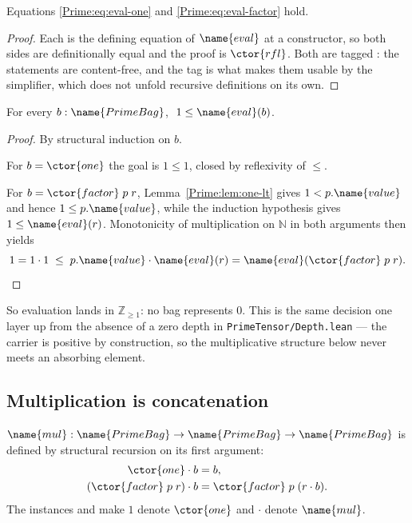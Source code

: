 \begin{lemma}
\label{Prime:lem:eval-eqs}
Equations \eqref{Prime:eq:eval-one} and \eqref{Prime:eq:eval-factor} hold.
\end{lemma}

\begin{proof}
Each is the defining equation of $\name{eval}$ at a constructor, so both sides
are definitionally equal and the proof is $\ctor{rfl}$.  Both are tagged
: the statements are content-free, and the tag is what makes
them usable by the simplifier, which does not unfold recursive definitions on
its own.
\end{proof}

\begin{lemma}\label{Prime:lem:one-le-eval}
For every $b : \name{PrimeBag}$, $\; 1 \leq \name{eval}(b)$.
\end{lemma}

\begin{proof}
By structural induction on $b$.

For $b = \ctor{one}$ the goal is $1 \leq 1$, closed by reflexivity of $\leq$.

For $b = \ctor{factor}\;p\;r$, Lemma~\ref{Prime:lem:one-lt} gives
$1 < p.\name{value}$ and hence $1 \leq p.\name{value}$, while the induction
hypothesis gives $1 \leq \name{eval}(r)$.  Monotonicity of multiplication on
$\mathbb{N}$ in both arguments then yields
\[
  1 = 1 \cdot 1 \;\leq\; p.\name{value} \cdot \name{eval}(r)
    = \name{eval}(\ctor{factor}\;p\;r). \qedhere
\]
\end{proof}

So evaluation lands in $\mathbb{Z}_{\geq 1}$: no bag represents $0$.  This is
the same decision one layer up from the absence of a zero depth in
\texttt{PrimeTensor/Depth.lean} --- the carrier is positive by construction,
so the multiplicative structure below never meets an absorbing element.

\subsection{Multiplication is concatenation}

\begin{definition}
\label{Prime:def:bag-mul}
$\name{mul} : \name{PrimeBag} \to \name{PrimeBag} \to \name{PrimeBag}$ is
defined by structural recursion on its first argument:
\begin{align}
  \ctor{one} \cdot b &= b, \label{Prime:eq:mul-one-left}\\
  (\ctor{factor}\;p\;r) \cdot b &= \ctor{factor}\;p\;(r \cdot b).
    \label{Prime:eq:mul-factor}
\end{align}
The instances  and  make $1$ denote
$\ctor{one}$ and $\cdot$ denote $\name{mul}$.
\end{definition}

